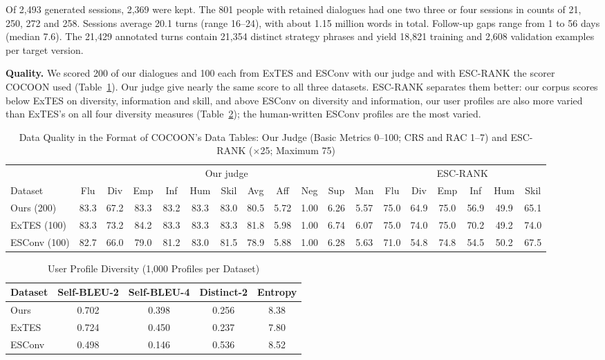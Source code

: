 \documentclass[journal]{IEEEtran}
\newcommand{\tsize}{\footnotesize}
\begin{document}
Of 2,493 generated sessions, 2,369 were kept. The 801 people with retained dialogues had one two three or four sessions in counts of 21, 250, 272 and 258. Sessions average 20.1 turns (range 16--24), with about 1.15 million words in total. Follow-up gaps range from 1 to 56 days (median 7.6). The 21,429 annotated turns contain 21,354 distinct strategy phrases and yield 18,821 training and 2,608 validation examples per target version.

\textbf{Quality.} We scored 200 of our dialogues and 100 each from ExTES and ESConv with our judge and with ESC-RANK the scorer COCOON used (Table~\ref{tab:quality}). Our judge give nearly the same score to all three datasets. ESC-RANK separates them better: our corpus scores below ExTES on diversity, information and skill, and above ESConv on diversity and information, our user profiles are also more varied than ExTES's on all four diversity measures (Table~\ref{tab:div}); the human-written ESConv profiles are the most varied.

\begin{table}[!t]
\caption{Data Quality in the Format of COCOON's Data Tables: Our Judge (Basic Metrics 0--100; CRS and RAC 1--7) and ESC-RANK (\(\times\)25; Maximum 75)}
\label{tab:quality}
\centering\tsize
\begin{tabular}{@{}lccccccccccc|cccccc@{}}
\toprule
 & \multicolumn{11}{c|}{Our judge} & \multicolumn{6}{c}{ESC-RANK}\\
Dataset & Flu & Div & Emp & Inf & Hum & Skil & Avg & Aff & Neg & Sup & Man & Flu & Div & Emp & Inf & Hum & Skil\\
\midrule
Ours (200) & 83.3 & 67.2 & 83.3 & 83.2 & 83.3 & 83.0 & 80.5 & 5.72 & 1.00 & 6.26 & 5.57 & 75.0 & 64.9 & 75.0 & 56.9 & 49.9 & 65.1\\
ExTES (100) & 83.3 & 73.2 & 84.2 & 83.3 & 83.3 & 83.3 & 81.8 & 5.98 & 1.00 & 6.74 & 6.07 & 75.0 & 74.0 & 75.0 & 70.2 & 49.2 & 74.0\\
ESConv (100) & 82.7 & 66.0 & 79.0 & 81.2 & 83.0 & 81.5 & 78.9 & 5.88 & 1.00 & 6.28 & 5.63 & 71.0 & 54.8 & 74.8 & 54.5 & 50.2 & 67.5\\
\bottomrule
\end{tabular}
\end{table}

\begin{table}[!htb]
\caption{User Profile Diversity (1,000 Profiles per Dataset)}
\label{tab:div}
\centering\tsize
\begin{tabular}{@{}lcccc@{}}
\toprule
Dataset & Self-BLEU-2 & Self-BLEU-4 & Distinct-2 & Entropy\\
\midrule
Ours & 0.702 & 0.398 & 0.256 & 8.38\\
ExTES & 0.724 & 0.450 & 0.237 & 7.80\\
ESConv & 0.498 & 0.146 & 0.536 & 8.52\\
\bottomrule
\end{tabular}
\end{table}
\end{document}

